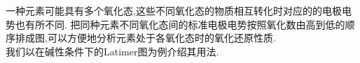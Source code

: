 \documentclass{ctexart}
\begin{document}
\indent 一种元素可能具有多个氧化态,这些不同氧化态的物质相互转化时对应的的电极电势也有所不同.%
把同种元素不同氧化态间的标准电极电势按照氧化数由高到低的顺序排成图,可以方便地分析元素处于各氧化态时的氧化还原性质.\\
\indent 我们以在碱性条件下的Latimer图为例介绍其用法.
\begin{figure}[H]
    \centering
\end{figure}
\begin{theorem}[]
    
\end{theorem}
\end{document}
